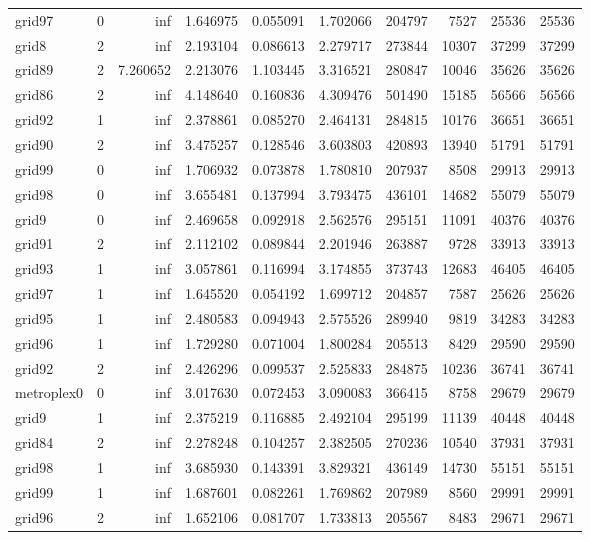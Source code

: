 \documentclass[../../../thesis.tex]{subfiles}
\begin{document}
\begin{longtable}{|l|r|r|r|r|r|r|r|r|r|}
grid97 & 0 & inf & 1.646975 & 0.055091 & 1.702066 & 204797 & 7527 & 25536 & 25536 \\
grid8 & 2 & inf & 2.193104 & 0.086613 & 2.279717 & 273844 & 10307 & 37299 & 37299 \\
grid89 & 2 & 7.260652 & 2.213076 & 1.103445 & 3.316521 & 280847 & 10046 & 35626 & 35626 \\
grid86 & 2 & inf & 4.148640 & 0.160836 & 4.309476 & 501490 & 15185 & 56566 & 56566 \\
grid92 & 1 & inf & 2.378861 & 0.085270 & 2.464131 & 284815 & 10176 & 36651 & 36651 \\
grid90 & 2 & inf & 3.475257 & 0.128546 & 3.603803 & 420893 & 13940 & 51791 & 51791 \\
grid99 & 0 & inf & 1.706932 & 0.073878 & 1.780810 & 207937 & 8508 & 29913 & 29913 \\
grid98 & 0 & inf & 3.655481 & 0.137994 & 3.793475 & 436101 & 14682 & 55079 & 55079 \\
grid9 & 0 & inf & 2.469658 & 0.092918 & 2.562576 & 295151 & 11091 & 40376 & 40376 \\
grid91 & 2 & inf & 2.112102 & 0.089844 & 2.201946 & 263887 & 9728 & 33913 & 33913 \\
grid93 & 1 & inf & 3.057861 & 0.116994 & 3.174855 & 373743 & 12683 & 46405 & 46405 \\
grid97 & 1 & inf & 1.645520 & 0.054192 & 1.699712 & 204857 & 7587 & 25626 & 25626 \\
grid95 & 1 & inf & 2.480583 & 0.094943 & 2.575526 & 289940 & 9819 & 34283 & 34283 \\
grid96 & 1 & inf & 1.729280 & 0.071004 & 1.800284 & 205513 & 8429 & 29590 & 29590 \\
grid92 & 2 & inf & 2.426296 & 0.099537 & 2.525833 & 284875 & 10236 & 36741 & 36741 \\
metroplex0 & 0 & inf & 3.017630 & 0.072453 & 3.090083 & 366415 & 8758 & 29679 & 29679 \\
grid9 & 1 & inf & 2.375219 & 0.116885 & 2.492104 & 295199 & 11139 & 40448 & 40448 \\
grid84 & 2 & inf & 2.278248 & 0.104257 & 2.382505 & 270236 & 10540 & 37931 & 37931 \\
grid98 & 1 & inf & 3.685930 & 0.143391 & 3.829321 & 436149 & 14730 & 55151 & 55151 \\
grid99 & 1 & inf & 1.687601 & 0.082261 & 1.769862 & 207989 & 8560 & 29991 & 29991 \\
grid96 & 2 & inf & 1.652106 & 0.081707 & 1.733813 & 205567 & 8483 & 29671 & 29671 \\

\end{longtable}
\end{document}
